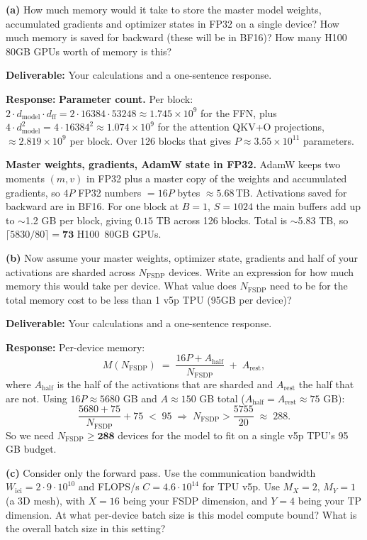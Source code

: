 \documentclass[11pt]{article}
\begin{document}
\textbf{(a)} How much memory would it take to store the master model weights, accumulated gradients and optimizer states in FP32 on a single device? How much memory is saved for backward (these will be in BF16)? How many H100 80GB GPUs worth of memory is this?

\textbf{Deliverable:} Your calculations and a one-sentence response.

\textbf{Response:}
\textbf{Parameter count.} Per block: $2 \cdot d_\text{model} \cdot d_\text{ff} = 2 \cdot 16384 \cdot 53248 \approx 1.745 \times 10^9$ for the FFN, plus $4 \cdot d_\text{model}^2 = 4 \cdot 16384^2 \approx 1.074 \times 10^9$ for the attention QKV+O projections, $\approx 2.819 \times 10^9$ per block. Over 126 blocks that gives $P \approx 3.55 \times 10^{11}$ parameters.

\textbf{Master weights, gradients, AdamW state in FP32.} AdamW keeps two moments $(m, v)$ in FP32 plus a master copy of the weights and accumulated gradients, so $4 P$ FP32 numbers $= 16 P$ bytes $\approx 5.68\,\text{TB}$. Activations saved for backward are in BF16. For one block at $B = 1$, $S = 1024$ the main buffers add up to $\sim$1.2 GB per block, giving $0.15$ TB across 126 blocks. Total is $\sim$5.83 TB, so $\lceil 5830 / 80 \rceil = \mathbf{73}$ H100~80GB GPUs.

\textbf{(b)} Now assume your master weights, optimizer state, gradients and half of your activations are sharded across $N_{\text{FSDP}}$ devices. Write an expression for how much memory this would take per device. What value does $N_{\text{FSDP}}$ need to be for the total memory cost to be less than 1 v5p TPU (95GB per device)?

\textbf{Deliverable:} Your calculations and a one-sentence response.

\textbf{Response:}
Per-device memory:
\[
M(N_\text{FSDP}) \;=\; \frac{16 P + A_\text{half}}{N_\text{FSDP}} \;+\; A_\text{rest},
\]
where $A_\text{half}$ is the half of the activations that are sharded and $A_\text{rest}$ the half that are not. Using $16 P \approx 5680$ GB and $A \approx 150$ GB total ($A_\text{half} = A_\text{rest} \approx 75$ GB):
\[
\frac{5680 + 75}{N_\text{FSDP}} + 75 \;<\; 95 \;\Longrightarrow\; N_\text{FSDP} > \frac{5755}{20} \;\approx\; 288.
\]
So we need $N_\text{FSDP} \ge \mathbf{288}$ devices for the model to fit on a single v5p TPU's 95 GB budget.

\textbf{(c)} Consider only the forward pass. Use the communication bandwidth $W_{\text{ici}} = 2 \cdot 9 \cdot 10^{10}$ and FLOPS/s $C = 4.6 \cdot 10^{14}$ for TPU v5p. Use $M_X = 2$, $M_Y = 1$ (a 3D mesh), with $X = 16$ being your FSDP dimension, and $Y = 4$ being your TP dimension. At what per-device batch size is this model compute bound? What is the overall batch size in this setting?
\end{document}
